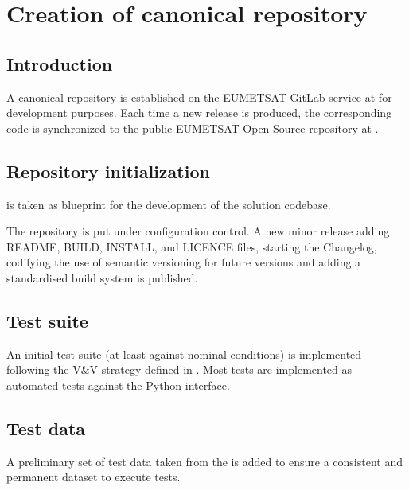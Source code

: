 \documentclass[a4paper,10pt,english]{sphinxmanual}
\begin{document}
\chapter{Creation of canonical repository}
\label{\detokenize{canonical_repository:creation-of-canonical-repository}}\label{\detokenize{canonical_repository::doc}}

\section{Introduction}
\label{\detokenize{canonical_repository:introduction}}
\sphinxAtStartPar
A canonical repository is established on the EUMETSAT GitLab service at 
for development purposes. Each time a new release is produced, the corresponding code is synchronized to the public
EUMETSAT Open Source repository at .


\section{Repository initialization}
\label{\detokenize{canonical_repository:repository-initialization}}\label{\detokenize{canonical_repository:id1}}
\sphinxAtStartPar
{\hyperref[\detokenize{introduction:fcidecomp-latest}]{}} is taken as blueprint for the development of the solution codebase.

\sphinxAtStartPar
The repository is put under configuration control. A new minor release adding README, BUILD, INSTALL, and LICENCE
files, starting the Changelog, codifying the use of semantic versioning for future versions and adding a standardised
build system is published.


\section{Test suite}
\label{\detokenize{canonical_repository:test-suite}}
\sphinxAtStartPar
An initial test suite (at least against nominal conditions) is implemented following the V\&V strategy defined in
. Most tests are implemented as automated tests against the Python interface.


\section{Test data}
\label{\detokenize{canonical_repository:test-data}}
\sphinxAtStartPar
A preliminary set of test data taken from the {\hyperref[\detokenize{introduction:fcidecomp-test-data}]{}} is added to ensure a
consistent and permanent dataset to execute tests.
\end{document}

